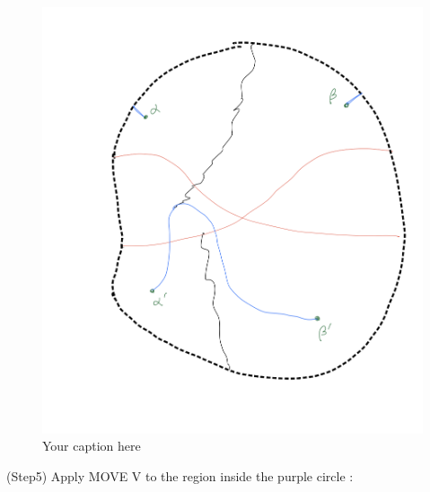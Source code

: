 \begin{figure}[H] %
    \centering
    \includegraphics[width=\linewidth]{diagrams/definition10/9.png} %
    \caption{Your caption here}
    \label{fig:your-label}
\end{figure}

(Step5) Apply MOVE \RN{5} to the region inside the purple circle :

